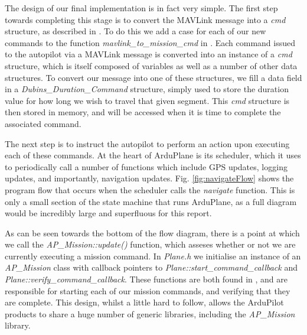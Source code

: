 The design of our final implementation is in fact very simple. The first step towards completing this stage is to convert the MAVLink message into a \textit{cmd} structure, as described in \cite{ArduPilotMAVLink}. To do this we add a case for each of our new commands to the function \textit{mavlink\_to\_mission\_cmd} in . Each command issued to the autopilot via a MAVLink message is converted into an instance of a \textit{cmd} structure, which is itself composed of variables as well as a number of other data structures. To convert our message into one of these structures, we fill a data field in a \textit{Dubins\_Duration\_Command} structure, simply used to store the duration value for how long we wish to travel that given segment. This \textit{cmd} structure is then stored in memory, and will be accessed when it is time to complete the associated command. 

The next step is to instruct the autopilot to perform an action upon executing each of these commands. At the heart of ArduPlane is its scheduler, which it uses to periodically call a number of functions which include GPS updates, logging updates, and importantly, navigation updates. Fig. \ref{fig:navigateFlow} shows the program flow that occurs when the scheduler calls the \textit{navigate} function. This is only a small section of the state machine that runs ArduPlane, as a full diagram would be incredibly large and superfluous for this report. 

As can be seen towards the bottom of the flow diagram, there is a point at which we call the \textit{AP\_Mission::update()} function, which asseses whether or not we are currently executing a mission command. In \textit{Plane.h} we initialise an instance of an \textit{AP\_Mission} class with callback pointers to \textit{Plane::start\_command\_callback} and \textit{Plane::verify\_command\_callback}. These functions are both found in , and are responsible for starting each of our mission commands, and verifying that they are complete. This design, whilst a little hard to follow, allows the ArduPilot products to share a huge number of generic libraries, including the \textit{AP\_Mission} library.  


